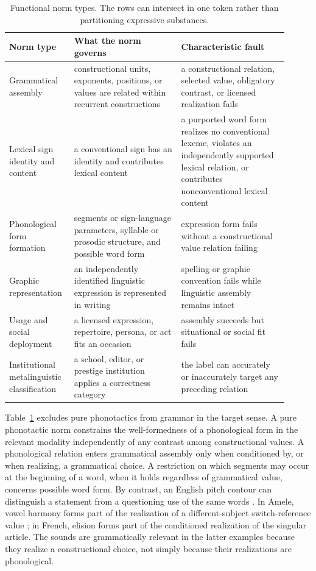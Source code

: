 \documentclass[12pt,letterpaper]{article}
\begin{document}
\begin{table}[ht]
\centering
\scriptsize
\setlength{\tabcolsep}{3pt}
\begin{tabular}{@{}p{0.19\linewidth}p{0.36\linewidth}p{0.36\linewidth}@{}}
\toprule
\textbf{Norm type} & \textbf{What the norm governs} & \textbf{Characteristic fault} \\
\midrule
Grammatical assembly & constructional units, exponents, positions, or values are related within recurrent constructions & a constructional relation, selected value, obligatory contrast, or licensed realization fails \\
Lexical sign identity and content & a conventional sign has an identity and contributes lexical content & a purported word form realizes no conventional lexeme, violates an independently supported lexical relation, or contributes nonconventional lexical content \\
Phonological form formation & segments or sign-language parameters, syllable or prosodic structure, and possible word form & expression form fails without a constructional value relation failing \\
Graphic representation & an independently identified linguistic expression is represented in writing & spelling or graphic convention fails while linguistic assembly remains intact \\
Usage and social deployment & a licensed expression, repertoire, persona, or act fits an occasion & assembly succeeds but situational or social fit fails \\
Institutional metalinguistic classification & a school, editor, or prestige institution applies a correctness category & the label can accurately or inaccurately target any preceding relation \\
\bottomrule
\end{tabular}
\caption{Functional norm types. The rows can intersect in one token rather than
partitioning expressive substances.}
\label{tab:norm-types}
\end{table}

Table~\ref{tab:norm-types} excludes pure phonotactics from grammar in the target
sense. A pure phonotactic norm constrains the well-formedness of a phonological
form in the relevant modality
independently of any contrast among constructional values. A phonological relation
enters grammatical assembly only when conditioned by, or when realizing, a
grammatical choice. A restriction on which segments may occur at the beginning of
a word, when it holds regardless of grammatical value, concerns possible word
form. By contrast, an English pitch contour
can distinguish a statement from a questioning use of the same words
\citep[6--7]{ladd2008}. In Amele, vowel harmony forms part of the realization of a
different-subject switch-reference value \citep[363]{roberts1987}; in French, elision
forms part of the conditioned realization of the singular article. The sounds are
grammatically relevant in the latter examples because they realize a
constructional choice, not simply because their realizations are phonological.
\end{document}
